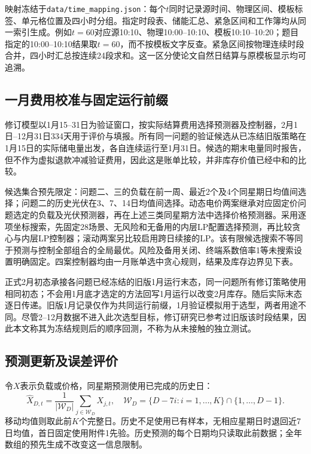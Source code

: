 映射冻结于\texttt{data/time\_mapping.json}：每个$t$同时记录源时间、物理区间、模板标签、单元格位置及四小时分组。指定时段表、储能汇总、紧急区间和工作簿均从同一索引生成。例如$t=60$对应源10:10、物理10:00--10:10、模板10:10--10:20；题目指定的10:00--10:10结果取$t=60$，而不按模板文字反查。紧急区间按物理连续时段合并，四小时汇总按连续24段求和。这一区分使论文自然日结算与原模板显示均可追溯。

\subsection{一月费用校准与固定运行前缀}

修订模型以1月15--31日为验证窗口，按实际结算费用选择预测器及控制器，2月1日--12月31日334天用于评价与填报。所有同一问题的验证候选从已冻结旧版策略在1月15日的实际储电量出发，各自连续运行至1月31日。候选的期末电量同时报告，但不作为虚拟退款冲减验证费用，因此这是账单比较，并非库存价值已经中和的比较。

候选集合预先限定：问题二、三的负载在前一周、最近2个及4个同星期日均值间选择；问题二的历史光伏在3、7、14日均值间选择。动态电价两案继承对应固定价问题选定的负载及光伏预测器，再在上述三类同星期方法中选择价格预测器。采用逐项坐标搜索，先固定28场景、无风险和无备用的内层LP配置选择预测，再比较贪心与内层LP控制器；滚动两案另比较启用跨日续接的LP。该有限候选搜索不等同于预测与控制全部组合的全局最优。风险及备用关闭、终端系数倍率1等未搜索设置明确固定。四案控制器均由一月账单选中贪心规则，结果及库存边界见下表。



正式2月初态承接各问题已经冻结的旧版1月运行末态，同一问题所有修订策略使用相同初态；不会用1月底才选定的方法回写1月运行以改变2月库存。随后实际末态逐日传递。旧版1月记录仅作为共同运行前缀，1月验证模拟用于选型，两者用途不同。尽管2--12月数据不进入此次选型目标，修订研究已参考过旧版该时段结果，因此本文称其为冻结规则后的顺序回测，不称为从未接触的独立测试。

\subsection{预测更新及误差评价}

令$X$表示负载或价格，同星期预测使用已完成的历史日：
\begin{equation}
 \widehat X_{D,t}=\frac{1}{|\mathcal W_D|}\sum_{j\in\mathcal W_D}X_{j,t},\quad
 \mathcal W_D=\{D-7i:i=1,\ldots,K\}\cap\{1,\ldots,D-1\}.
 \label{eq:weekday_forecast}
\end{equation}
移动均值则取此前$K$个完整日。历史不足使用已有样本，无相应星期日时退回近7日均值，首日固定使用附件1先验。历史预测的每个日期均只读取此前数据；全年数组的预先生成不改变这一信息限制。

